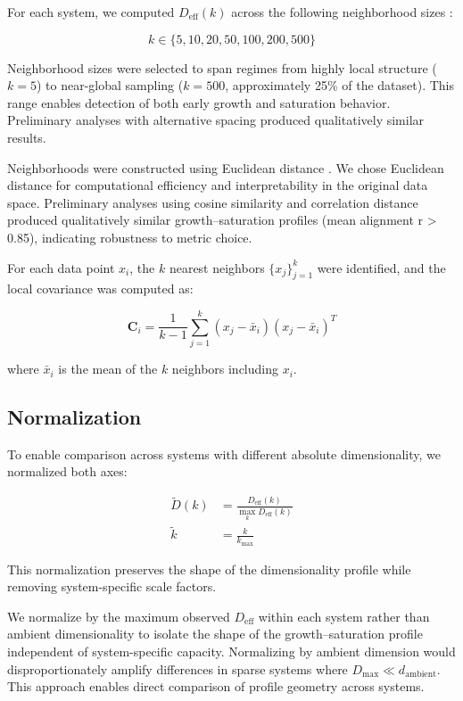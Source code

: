 For each system, we computed $D_{\mathrm{eff}}(k)$ across the following neighborhood sizes \citep{Mante2013}:

\[
	k \in \{5, 10, 20, 50, 100, 200, 500\}
\]

Neighborhood sizes were selected to span regimes from highly local structure ($k=5$) to near-global sampling ($k=500$, approximately 25\% of the dataset). This range enables detection of both early growth and saturation behavior. Preliminary analyses with alternative spacing produced qualitatively similar results.

Neighborhoods were constructed using Euclidean distance \citep{Ecker2011}. We chose Euclidean distance for computational efficiency and interpretability in the original data space. Preliminary analyses using cosine similarity and correlation distance produced qualitatively similar growth--saturation profiles (mean alignment r > 0.85), indicating robustness to metric choice.

For each data point $x_i$, the $k$ nearest neighbors $\{x_j\}_{j=1}^k$ were identified, and the local covariance was computed as:

\begin{equation}
	\mathbf{C}_i = \frac{1}{k-1} \sum_{j=1}^k (x_j - \bar{x}_i)(x_j - \bar{x}_i)^T
\end{equation}

where $\bar{x}_i$ is the mean of the $k$ neighbors including $x_i$.

\subsection{Normalization}

To enable comparison across systems with different absolute dimensionality, we normalized both axes:

\begin{align}
	\tilde{D}(k) & = \frac{D_{\mathrm{eff}}(k)}{\max_k D_{\mathrm{eff}}(k)} \label{eq:norm_d} \\
	\tilde{k}    & = \frac{k}{k_{\max}} \label{eq:norm_k}
\end{align}

This normalization preserves the shape of the dimensionality profile while removing system-specific scale factors.

We normalize by the maximum observed $D_{\text{eff}}$ within each system rather than ambient dimensionality to isolate the shape of the growth--saturation profile independent of system-specific capacity. Normalizing by ambient dimension would disproportionately amplify differences in sparse systems where $D_{\max} \ll d_{\text{ambient}}$. This approach enables direct comparison of profile geometry across systems.

